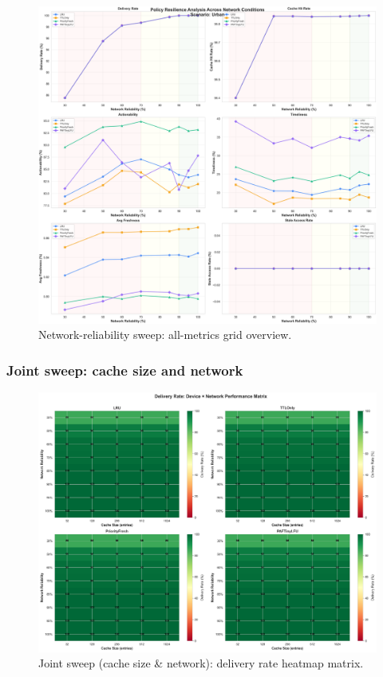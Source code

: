 \documentclass[11pt,twocolumn]{article}
\begin{document}
\begin{figure}[h]
    \centering
    \includegraphics[width=\linewidth]{figures/network_all_metrics_grid.png}
    \caption{Network-reliability sweep: all-metrics grid overview.}
    \label{fig:network-all-grid}
\end{figure}

\subsubsection{Joint sweep: cache size and network}
\begin{figure}[h]
    \centering
    \includegraphics[width=\linewidth]{figures/combined_heatmap_matrix_deliveryRate.png}
    \caption{Joint sweep (cache size \& network): delivery rate heatmap matrix.}
    \label{fig:combined-heatmap-delivery}
\end{figure}
\end{document}
